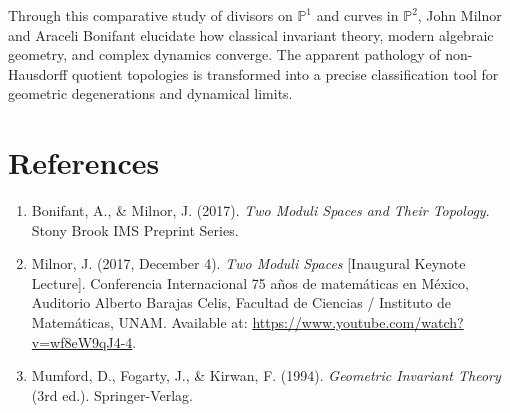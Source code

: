 \documentclass[11pt,a4paper]{article}
\begin{document}
Through this comparative study of divisors on $\mathbb{P}^1$ and curves in $\mathbb{P}^2$, John Milnor and Araceli Bonifant elucidate how classical invariant theory, modern algebraic geometry, and complex dynamics converge. The apparent pathology of non-Hausdorff quotient topologies is transformed into a precise classification tool for geometric degenerations and dynamical limits.

\section*{References}
\begin{enumerate}
    \item Bonifant, A., \& Milnor, J. (2017). \textit{Two Moduli Spaces and Their Topology}. Stony Brook IMS Preprint Series.
    \item Milnor, J. (2017, December 4). \textit{Two Moduli Spaces} [Inaugural Keynote Lecture]. Conferencia Internacional 75 a\~nos de matem\'aticas en M\'exico, Auditorio Alberto Barajas Celis, Facultad de Ciencias / Instituto de Matem\'aticas, UNAM. Available at: \url{https://www.youtube.com/watch?v=wf8eW9qJ4-4}.
    \item Mumford, D., Fogarty, J., \& Kirwan, F. (1994). \textit{Geometric Invariant Theory} (3rd ed.). Springer-Verlag.
\end{enumerate}
\end{document}
